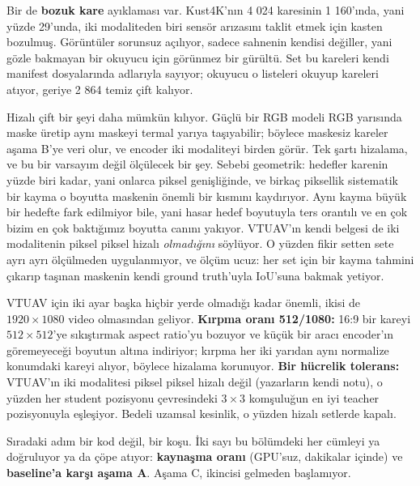 Bir de \textbf{bozuk kare} ayıklaması var. Kust4K'nın 4 024 karesinin
1 160'ında, yani yüzde 29'unda, iki modaliteden biri sensör arızasını
taklit etmek için kasten bozulmuş. Görüntüler sorunsuz açılıyor, sadece
sahnenin kendisi değiller, yani gözle bakmayan bir okuyucu için görünmez
bir gürültü. Set bu kareleri kendi manifest dosyalarında adlarıyla
sayıyor; okuyucu o listeleri okuyup kareleri atıyor, geriye 2 864 temiz
çift kalıyor.

Hizalı çift bir şeyi daha mümkün kılıyor. Güçlü bir RGB modeli RGB
yarısında maske üretip aynı maskeyi termal yarıya taşıyabilir; böylece
maskesiz kareler aşama B'ye veri olur, ve encoder iki modaliteyi birden
görür. Tek şartı hizalama, ve bu bir varsayım değil ölçülecek bir şey.
Sebebi geometrik: hedefler karenin yüzde biri kadar, yani onlarca piksel
genişliğinde, ve birkaç piksellik sistematik bir kayma o boyutta maskenin
önemli bir kısmını kaydırıyor. Aynı kayma büyük bir hedefte fark
edilmiyor bile, yani hasar hedef boyutuyla ters orantılı ve en çok bizim
en çok baktığımız boyutta canını yakıyor. VTUAV'ın kendi belgesi de iki
modalitenin piksel piksel hizalı \emph{olmadığını} söylüyor. O yüzden fikir
setten sete ayrı ayrı ölçülmeden uygulanmıyor, ve ölçüm ucuz: her set için
bir kayma tahmini çıkarıp taşınan maskenin kendi ground truth'uyla IoU'suna
bakmak yetiyor.

VTUAV için iki ayar başka hiçbir yerde olmadığı kadar önemli, ikisi de
$1920\times1080$ video olmasından geliyor. \textbf{Kırpma oranı 512/1080:}
16:9 bir kareyi $512\times512$'ye sıkıştırmak aspect ratio'yu bozuyor ve
küçük bir aracı encoder'ın göremeyeceği boyutun altına indiriyor; kırpma
her iki yarıdan aynı normalize konumdaki kareyi alıyor, böylece hizalama
korunuyor. \textbf{Bir hücrelik tolerans:} VTUAV'ın iki modalitesi piksel
piksel hizalı değil (yazarların kendi notu), o yüzden her student pozisyonu
çevresindeki $3\times3$ komşuluğun en iyi teacher pozisyonuyla eşleşiyor.
Bedeli uzamsal kesinlik, o yüzden hizalı setlerde kapalı.

\bigskip
\noindent
Sıradaki adım bir kod değil, bir koşu. İki sayı bu bölümdeki her cümleyi ya
doğruluyor ya da çöpe atıyor: \textbf{kaynaşma oranı} (GPU'suz, dakikalar
içinde) ve \textbf{baseline'a karşı aşama A}. Aşama C, ikincisi gelmeden
başlamıyor.
